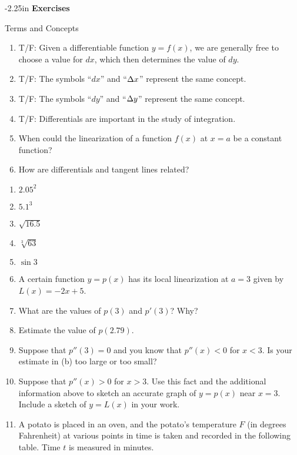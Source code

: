 \begin{adjustwidth*}{}{-2.25in}
\textbf{{\large Exercises}}
\setlength{\columnsep}{25pt}
\begin{multicols*}{2}
\noindent Terms and Concepts \small
\begin{enumerate}[1)]
\item T/F: Given a differentiable function $y=f(x)$, we are generally free to choose a value for $dx$, which then determines the value of $dy$.
\item T/F: The symbols ``$dx$'' and ``$\Delta x$'' represent the same concept.
\item T/F: The symbols ``$dy$'' and ``$\Delta y$'' represent the same concept.
\item T/F: Differentials are important in the study of integration.
\item When could the linearization of a function $f(x)$ at $x=a$ be a constant function?
\item How are differentials and tangent lines related?
\end{enumerate} 

 \small


\begin{enumerate}[1),resume]
\item $2.05^2$
\item $5.1^3$
\item $\sqrt{16.5}$
\item $\sqrt[3]{63}$
\item $\sin 3$

\item A certain function $y=p(x)$ has its local linearization at $a = 3$ given by $L(x) = -2x + 5$.

\ba
	\item What are the values of $p(3)$ and $p'(3)$?  Why?
	\item Estimate the value of $p(2.79)$.
	\item Suppose that $p''(3) = 0$ and you know that $p''(x) < 0$ for $x < 3$.  Is your estimate in (b) too large or too small?
	\item Suppose that $p''(x) > 0$ for $x > 3$.  Use this fact and the additional information above to sketch an accurate graph of $y = p(x)$ near $x = 3$.  Include a sketch of $y = L(x)$ in your work.
\ea

\item A potato is placed in an oven, and the potato's temperature $F$ (in degrees Fahrenheit) at various points in time is taken and recorded in the following table. Time $t$ is measured in minutes.


\end{enumerate}
\end{multicols*}
\end{adjustwidth*}
